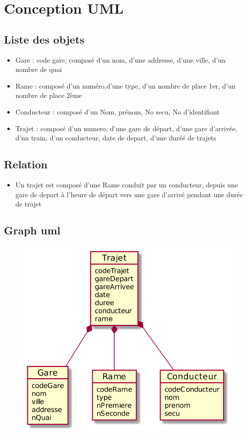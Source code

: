 \section{Conception UML}
\subsection{Liste des objets}
\begin{itemize}
\item Gare : code gare, composé d'un nom, d'une addresse, d'une ville, d'un nombre de quai
\item Rame : composé d'un numéro,d'une type, d'un nombre de place 1er, d'un nombre de place 2ème
\item Conducteur : composé d'un Nom, prénom, No secu, No d'identifiant

\item Trajet : composé d'un numero, d'une gare de départ, d'une gare d'arrivée, d'un train, d'un conducteur, date de depart, d'une duréé de trajets

\end{itemize}

\subsection{Relation}
\begin{itemize}
\item Un trajet est composé d'une Rame conduit par un conducteur, depuis une gare de depart à l'heure de départ vers une gare d'arrivé pendant une durée de trajet
\end{itemize}
\subsection{Graph uml}
\begin{figure}[h]
   \includegraphics[]{uml.png}
\end{figure}
